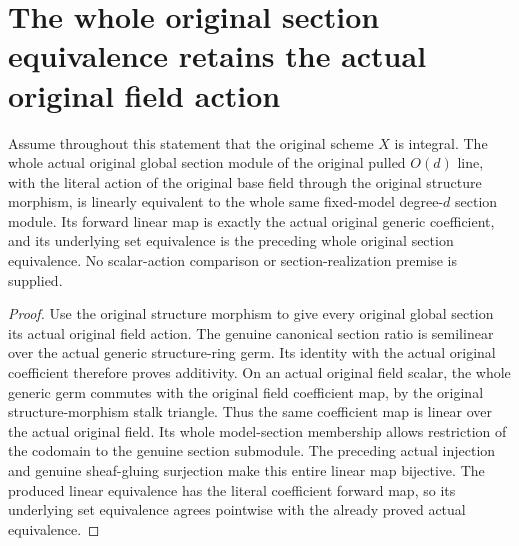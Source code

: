 \section{The whole original section equivalence retains the actual original field action}
\label{sec:native-pulled-projective-linear-sections}

\begin{theorem}
\label{thm:native-pulled-projective-linear-sections}
\leanok
{}
Assume throughout this statement that the original scheme $X$ is integral.
The whole actual original global section module of the original pulled
$O(d)$ line, with the literal action of the original base field through
the original structure morphism, is linearly equivalent to the whole
same fixed-model degree-$d$ section module. Its forward linear map is
exactly the actual original generic coefficient, and its underlying
set equivalence is the preceding whole original section equivalence.
No scalar-action comparison or section-realization premise is supplied.
\end{theorem}
\begin{proof}
Use the original structure morphism to give every original global section
its actual original field action. The genuine canonical section ratio is
semilinear over the actual generic structure-ring germ. Its identity with
the actual original coefficient therefore proves additivity. On an actual
original field scalar, the whole generic germ commutes with the original
field coefficient map, by the original structure-morphism stalk triangle.
Thus the same coefficient map is linear over the actual original field.
Its whole model-section membership allows restriction of the codomain to
the genuine section submodule. The preceding actual injection and genuine
sheaf-gluing surjection make this entire linear map bijective. The produced
linear equivalence has the literal coefficient forward map, so its underlying
set equivalence agrees pointwise with the already proved actual equivalence.
\end{proof}
